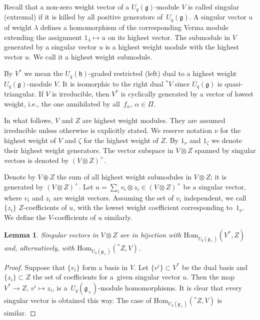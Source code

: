 \documentclass[pdftex]{sigma}
\numberwithin{equation}{section}
\newtheorem{Lemma}[Theorem]{Lemma}
\begin{document}
Recall that a non-zero weight vector of a $U_q(\mathfrak{g})$-module $V$ is called singular (extremal) if it is killed by all positive generators of~$U_q(\mathfrak{g})$. A singular vector $u$ of weight $\lambda$ defines a homomorphism of the corresponding Verma module extending the assignment $1_\lambda\mapsto u$ on its highest vector. The submodule in $V$ generated by a singular vector $u$ is a highest weight module with the highest vector $u$. We call it a highest weight submodule.

By $V^*$ we mean the $U_q(\mathfrak{h})$-graded restricted (left) dual to a highest weight $U_q(\mathfrak{g})$-module $V$. It is isomorphic to the right dual ${}^*\!V$ since $U_q(\mathfrak{g})$ is quasi-triangular. If $V$ is irreducible, then $V^*$ is cyclically generated by a vector of lowest weight, i.e., the one annihilated by all~$f_\alpha$, $\alpha \in \Pi$.

In what follows, $V$ and $Z$ are highest weight modules. They are assumed irreducible unless otherwise is explicitly stated. We reserve notation $\nu$ for the highest weight of $V$ and $\zeta$ for the highest weight of $Z$.
By $1_\nu$ and $1_\zeta$ we denote their highest weight generators. The vector subspace in $V\otimes Z$ spanned by singular vectors is denoted by $(V\otimes Z)^+$.

Denote by $V\circledast Z$ the sum of all highest weight submodules in $V\otimes Z$; it is generated by $(V\otimes Z)^+$. Let $u=\sum_{i}v_i\otimes z_i\in (V\otimes Z)^+$ be a singular vector, where $v_i$ and $z_i$ are weight vectors. Assuming the set of $v_i$ independent, we call $\{z_i\}$ $Z$-coefficients of $u$, with the lowest weight coefficient corresponding to~$1_\nu$. We define the $V$-coefficients of $u$ similarly.

\begin{Lemma}\label{duality}Singular vectors in $V\otimes Z$ are in bijection with $\mathrm{Hom}_{U_q(\mathfrak{g}_+)}(V^*,Z)$ and, alternatively, with $\mathrm{Hom}_{U_q(\mathfrak{g}_+)}({}^*\!Z,V)$.
\end{Lemma}
\begin{proof}Suppose that $\{v_i\}$ form a basis in $V$. Let $\{v^i\}\subset V^*$ be the dual basis and $\{z_i\}\subset Z$ the set of coefficients for a~given singular vector $u$. Then the map $V^*\to Z$, $v^i\mapsto z_i$, is a~$U_q(\mathfrak{g}_+)$-module homomorphisms. It is clear that every singular vector is obtained this way. The case of $\mathrm{Hom}_{U_q(\mathfrak{g}_+)}({}^*\!Z,V)$ is similar.
\end{proof}
\end{document}
